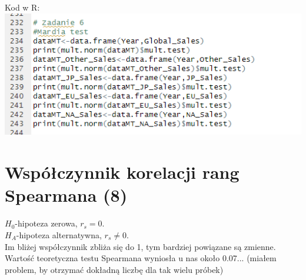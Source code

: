 \documentclass[12pt]{article}
\begin{document}
	Kod w R:\\
	\includegraphics[scale=0.6]{Zad6}
	\newpage
	\section{Współczynnik korelacji rang Spearmana (8)}
	\(H_0\)-hipoteza zerowa, \(r_{s}=0\).\\
	\(H_A\)-hipoteza alternatywna, \(r_{s}\neq0\).\\
Im bliżej współczynnik zbliża się do 1, tym bardziej powiązane są zmienne.
Wartość teoretyczna testu Spearmana wyniosła u nas około 0.07... (miałem problem, by otrzymać dokładną liczbę dla tak wielu próbek)\\ 
\end{document}
